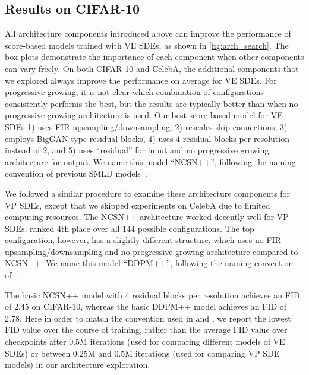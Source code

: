 \documentclass{article} %
\begin{document}
\subsection{Results on CIFAR-10}\label{app:rescifar10} 

All architecture components introduced above can improve the performance of score-based models trained with VE SDEs, as shown in \cref{fig:arch_search}. The box plots demonstrate the importance of each component when other components can vary freely. On both CIFAR-10 and CelebA, the additional components that we explored always improve the performance on average for VE SDEs. For progressive growing, it is not clear which combination of configurations consistently performs the best, but the results are typically better than when no progressive growing architecture is used. Our best score-based model for VE SDEs 1) uses FIR upsampling/downsampling, 2) rescales skip connections, 3) employs BigGAN-type residual blocks, 4) uses 4 residual blocks per resolution instead of 2, and 5) uses ``residual'' for input and no progressive growing architecture for output. We name this model ``NCSN++'', following the naming convention of previous SMLD models~\citep{song2019generative,song2020improved}. 

We followed a similar procedure to examine these architecture components for VP SDEs, except that we skipped experiments on CelebA due to limited computing resources. %
The NCSN++ architecture worked decently well for VP SDEs, ranked 4th place over all 144 possible configurations. The top configuration, however, has a slightly different structure, which uses no FIR upsampling/downsampling and no progressive growing architecture compared to NCSN++. We name this model ``DDPM++'', following the naming convention of~\citet{ho2020denoising}.


The basic NCSN++ model with 4 residual blocks per resolution achieves an FID of 2.45 on CIFAR-10, whereas the basic DDPM++ model achieves an FID of 2.78. Here in order to match the convention used in \citet{karras2018progressive,song2019generative} and \citet{ho2020denoising}, we report the lowest FID value over the course of training, rather than the average FID value over checkpoints after 0.5M iterations (used for comparing different models of VE SDEs) or between 0.25M and 0.5M iterations (used for comparing VP SDE models) in our architecture exploration. %
\end{document}

